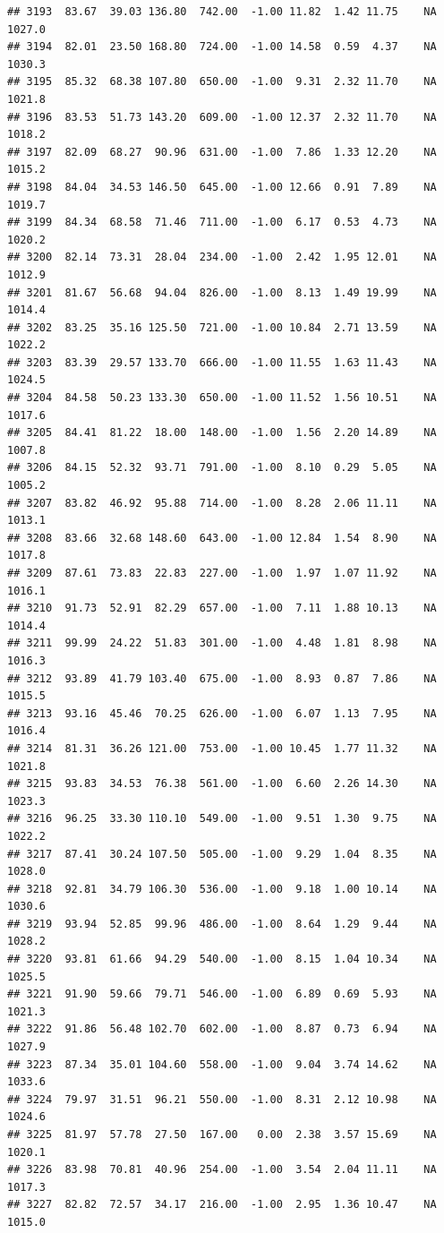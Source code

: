 \documentclass{article}\usepackage{graphicx, color}
\makeatletter
\newenvironment{kframe}{%
 \def\at@end@of@kframe{}%
 \ifinner\ifhmode%
  \def\at@end@of@kframe{\end{minipage}}%
  \begin{minipage}{\columnwidth}%
 \fi\fi%
 \def\FrameCommand##1{\hskip\@totalleftmargin \hskip-\fboxsep
 \colorbox{shadecolor}{##1}\hskip-\fboxsep
     \hskip-\linewidth \hskip-\@totalleftmargin \hskip\columnwidth}%
 \MakeFramed {\advance\hsize-\width
   \@totalleftmargin\z@ \linewidth\hsize
   \@setminipage}}%
 {\par\unskip\endMakeFramed%
 \at@end@of@kframe}
\newenvironment{knitrout}{}{} %
\makeatother
\begin{document}
\begin{knitrout}
\begin{kframe}
\begin{verbatim}
## 3193  83.67  39.03 136.80  742.00  -1.00 11.82  1.42 11.75    NA 1027.0
## 3194  82.01  23.50 168.80  724.00  -1.00 14.58  0.59  4.37    NA 1030.3
## 3195  85.32  68.38 107.80  650.00  -1.00  9.31  2.32 11.70    NA 1021.8
## 3196  83.53  51.73 143.20  609.00  -1.00 12.37  2.32 11.70    NA 1018.2
## 3197  82.09  68.27  90.96  631.00  -1.00  7.86  1.33 12.20    NA 1015.2
## 3198  84.04  34.53 146.50  645.00  -1.00 12.66  0.91  7.89    NA 1019.7
## 3199  84.34  68.58  71.46  711.00  -1.00  6.17  0.53  4.73    NA 1020.2
## 3200  82.14  73.31  28.04  234.00  -1.00  2.42  1.95 12.01    NA 1012.9
## 3201  81.67  56.68  94.04  826.00  -1.00  8.13  1.49 19.99    NA 1014.4
## 3202  83.25  35.16 125.50  721.00  -1.00 10.84  2.71 13.59    NA 1022.2
## 3203  83.39  29.57 133.70  666.00  -1.00 11.55  1.63 11.43    NA 1024.5
## 3204  84.58  50.23 133.30  650.00  -1.00 11.52  1.56 10.51    NA 1017.6
## 3205  84.41  81.22  18.00  148.00  -1.00  1.56  2.20 14.89    NA 1007.8
## 3206  84.15  52.32  93.71  791.00  -1.00  8.10  0.29  5.05    NA 1005.2
## 3207  83.82  46.92  95.88  714.00  -1.00  8.28  2.06 11.11    NA 1013.1
## 3208  83.66  32.68 148.60  643.00  -1.00 12.84  1.54  8.90    NA 1017.8
## 3209  87.61  73.83  22.83  227.00  -1.00  1.97  1.07 11.92    NA 1016.1
## 3210  91.73  52.91  82.29  657.00  -1.00  7.11  1.88 10.13    NA 1014.4
## 3211  99.99  24.22  51.83  301.00  -1.00  4.48  1.81  8.98    NA 1016.3
## 3212  93.89  41.79 103.40  675.00  -1.00  8.93  0.87  7.86    NA 1015.5
## 3213  93.16  45.46  70.25  626.00  -1.00  6.07  1.13  7.95    NA 1016.4
## 3214  81.31  36.26 121.00  753.00  -1.00 10.45  1.77 11.32    NA 1021.8
## 3215  93.83  34.53  76.38  561.00  -1.00  6.60  2.26 14.30    NA 1023.3
## 3216  96.25  33.30 110.10  549.00  -1.00  9.51  1.30  9.75    NA 1022.2
## 3217  87.41  30.24 107.50  505.00  -1.00  9.29  1.04  8.35    NA 1028.0
## 3218  92.81  34.79 106.30  536.00  -1.00  9.18  1.00 10.14    NA 1030.6
## 3219  93.94  52.85  99.96  486.00  -1.00  8.64  1.29  9.44    NA 1028.2
## 3220  93.81  61.66  94.29  540.00  -1.00  8.15  1.04 10.34    NA 1025.5
## 3221  91.90  59.66  79.71  546.00  -1.00  6.89  0.69  5.93    NA 1021.3
## 3222  91.86  56.48 102.70  602.00  -1.00  8.87  0.73  6.94    NA 1027.9
## 3223  87.34  35.01 104.60  558.00  -1.00  9.04  3.74 14.62    NA 1033.6
## 3224  79.97  31.51  96.21  550.00  -1.00  8.31  2.12 10.98    NA 1024.6
## 3225  81.97  57.78  27.50  167.00   0.00  2.38  3.57 15.69    NA 1020.1
## 3226  83.98  70.81  40.96  254.00  -1.00  3.54  2.04 11.11    NA 1017.3
## 3227  82.82  72.57  34.17  216.00  -1.00  2.95  1.36 10.47    NA 1015.0

\end{verbatim}
\end{kframe}
\end{knitrout}
\end{document}
